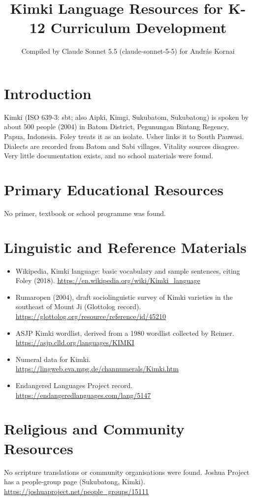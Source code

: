\documentclass[12pt]{article}
\title{Kimki Language Resources for K-12 Curriculum Development}
\author{Compiled by Claude Sonnet 5.5 (claude-sonnet-5-5) for Andr\'as Kornai}
\date{}
\begin{document}
\maketitle

\section{Introduction}
Kimki (ISO 639-3: sbt; also Aipki, Kimgi, Sukubatom, Sukubatong) is spoken by about 500 people (2004) in Batom District, Pegunungan Bintang Regency, Papua, Indonesia. Foley treats it as an isolate. Usher links it to South Pauwasi. Dialects are recorded from Batom and Sabi villages. Vitality sources disagree. Very little documentation exists, and no school materials were found.

\section{Primary Educational Resources}
No primer, textbook or school programme was found.

\section{Linguistic and Reference Materials}
\begin{itemize}
\item Wikipedia, Kimki language: basic vocabulary and sample sentences, citing Foley (2018). \url{https://en.wikipedia.org/wiki/Kimki_language}
\item Rumaropen (2004), draft sociolinguistic survey of Kimki varieties in the southeast of Mount Ji (Glottolog record). \url{https://glottolog.org/resource/reference/id/45210}
\item ASJP Kimki wordlist, derived from a 1980 wordlist collected by Reimer. \url{https://asjp.clld.org/languages/KIMKI}
\item Numeral data for Kimki. \url{https://lingweb.eva.mpg.de/channumerals/Kimki.htm}
\item Endangered Languages Project record. \url{https://endangeredlanguages.com/lang/5147}
\end{itemize}

\section{Religious and Community Resources}
No scripture translations or community organisations were found. Joshua Project has a people-group page (Sukubatong, Kimki). \url{https://joshuaproject.net/people_groups/15111}
\end{document}
